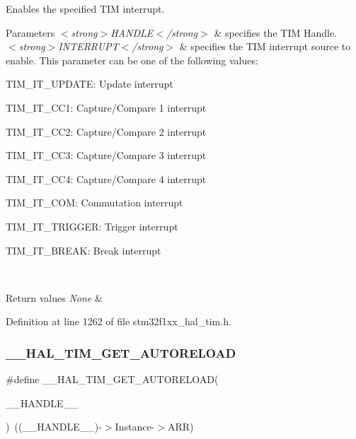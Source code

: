Enables the specified T\+IM interrupt. 


\begin{DoxyParams}{Parameters}
{\em $<$strong$>$\+H\+A\+N\+D\+L\+E$<$/strong$>$} & specifies the T\+IM Handle. \\
\hline
{\em $<$strong$>$\+I\+N\+T\+E\+R\+R\+U\+P\+T$<$/strong$>$} & specifies the T\+IM interrupt source to enable. This parameter can be one of the following values\+: \begin{DoxyItemize}
\item T\+I\+M\+\_\+\+I\+T\+\_\+\+U\+P\+D\+A\+TE\+: Update interrupt \item T\+I\+M\+\_\+\+I\+T\+\_\+\+C\+C1\+: Capture/\+Compare 1 interrupt \item T\+I\+M\+\_\+\+I\+T\+\_\+\+C\+C2\+: Capture/\+Compare 2 interrupt \item T\+I\+M\+\_\+\+I\+T\+\_\+\+C\+C3\+: Capture/\+Compare 3 interrupt \item T\+I\+M\+\_\+\+I\+T\+\_\+\+C\+C4\+: Capture/\+Compare 4 interrupt \item T\+I\+M\+\_\+\+I\+T\+\_\+\+C\+OM\+: Commutation interrupt \item T\+I\+M\+\_\+\+I\+T\+\_\+\+T\+R\+I\+G\+G\+ER\+: Trigger interrupt \item T\+I\+M\+\_\+\+I\+T\+\_\+\+B\+R\+E\+AK\+: Break interrupt \end{DoxyItemize}
\\
\hline
\end{DoxyParams}

\begin{DoxyRetVals}{Return values}
{\em None} & \\
\hline
\end{DoxyRetVals}


Definition at line 1262 of file stm32f1xx\+\_\+hal\+\_\+tim.\+h.

\mbox{\label{group___t_i_m___exported___macros_gaa7a5c7645695bad15bacd402513a028a}} 
\subsubsection{\texorpdfstring{\+\_\+\+\_\+\+H\+A\+L\+\_\+\+T\+I\+M\+\_\+\+G\+E\+T\+\_\+\+A\+U\+T\+O\+R\+E\+L\+O\+AD}{\_\_HAL\_TIM\_GET\_AUTORELOAD}}
{\footnotesize\ttfamily \#define \+\_\+\+\_\+\+H\+A\+L\+\_\+\+T\+I\+M\+\_\+\+G\+E\+T\+\_\+\+A\+U\+T\+O\+R\+E\+L\+O\+AD(\begin{DoxyParamCaption}\item[{}]{\+\_\+\+\_\+\+H\+A\+N\+D\+L\+E\+\_\+\+\_\+ }\end{DoxyParamCaption})~((\+\_\+\+\_\+\+H\+A\+N\+D\+L\+E\+\_\+\+\_\+)-\/$>$Instance-\/$>$A\+RR)}



